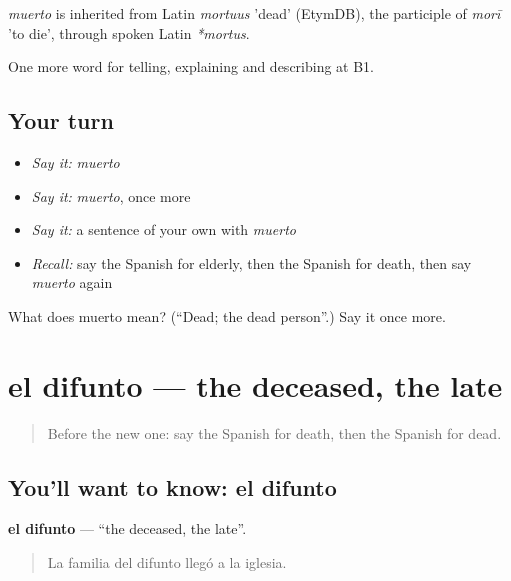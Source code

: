 \begin{cousinweb}
\emph{muerto} is inherited from Latin \emph{mortuus} 'dead' (EtymDB), the participle of \emph{morī} 'to die', through spoken Latin \emph{*mortus}.
\end{cousinweb}

\begin{grammarlens}[title={What you've built}]
One more word for telling, explaining and describing at B1.
\end{grammarlens}

\subsection*{Your turn}
\begin{itemize}
\raggedright
  \item \emph{Say it:} \emph{muerto}
  \item \emph{Say it:} \emph{muerto}, once more
  \item \emph{Say it:} a sentence of your own with \emph{muerto}
  \item \emph{Recall:} say the Spanish for elderly, then the Spanish for death, then say \emph{muerto} again
\end{itemize}

\begin{tcolorbox}[breakable,colback=teal!4,colframe=teal!35!black,title={Before you move on}]
What does muerto mean? (\textquotedblleft{}Dead; the dead person\textquotedblright{}.) Say it once more.
\end{tcolorbox}
\section[el difunto]{el difunto — the deceased, the late}

\label{lesson:ES-C555-difunto}



\begin{quote}
Before the new one: say the Spanish for death, then the Spanish for dead.
\end{quote}

\subsection*{You'll want to know: el difunto}
\textbf{el difunto} — \textquotedblleft{}the deceased, the late\textquotedblright{}.

\begin{quote}
La familia del difunto llegó a la iglesia.
\end{quote}

